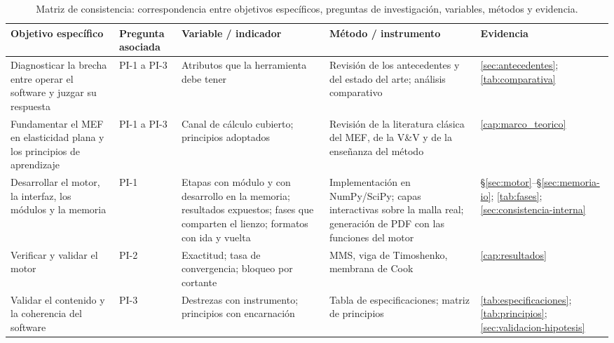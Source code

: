 \begin{table}[htbp]
\centering
\caption[Matriz de consistencia de la investigación.]{Matriz de consistencia: correspondencia entre objetivos específicos, preguntas de investigación, variables, métodos y evidencia.}
\label{tab:consistencia}
{\footnotesize
\setlength{\tabcolsep}{3pt}
\renewcommand{\arraystretch}{1.15}
\begin{tabular}{@{}>{\raggedright\arraybackslash}p{3.0cm}>{\raggedright\arraybackslash}p{1.6cm}>{\raggedright\arraybackslash}p{3.1cm}>{\raggedright\arraybackslash}p{3.3cm}>{\raggedright\arraybackslash}p{2.6cm}@{}}
\toprule
\textbf{Objetivo específico} & \textbf{Pregunta asociada} & \textbf{Variable / indicador} & \textbf{Método / instrumento} & \textbf{Evidencia} \\
\midrule
Diagnosticar la brecha entre operar el software y juzgar su respuesta & PI-1 a PI-3 & Atributos que la herramienta debe tener & Revisión de los antecedentes y del estado del arte; análisis comparativo & \autoref{sec:antecedentes}; \autoref{tab:comparativa} \\
Fundamentar el MEF en elasticidad plana y los principios de aprendizaje & PI-1 a PI-3 & Canal de cálculo cubierto; principios adoptados & Revisión de la literatura clásica del MEF, de la V\&V y de la enseñanza del método & \autoref{cap:marco_teorico} \\
Desarrollar el motor, la interfaz, los módulos y la memoria & PI-1 & Etapas con módulo y con desarrollo en la memoria; resultados expuestos; fases que comparten el lienzo; formatos con ida y vuelta & Implementación en NumPy/SciPy; capas interactivas sobre la malla real; generación de PDF con las funciones del motor & \S\ref{sec:motor}--\S\ref{sec:memoria-io}; \autoref{tab:fases}; \autoref{sec:consistencia-interna} \\
Verificar y validar el motor & PI-2 & Exactitud; tasa de convergencia; bloqueo por cortante & MMS, viga de Timoshenko, membrana de Cook & \autoref{cap:resultados} \\
Validar el contenido y la coherencia del software & PI-3 & Destrezas con instrumento; principios con encarnación & Tabla de especificaciones; matriz de principios & \autoref{tab:especificaciones}; \autoref{tab:principios}; \autoref{sec:validacion-hipotesis} \\
\bottomrule
\end{tabular}}
\end{table}

